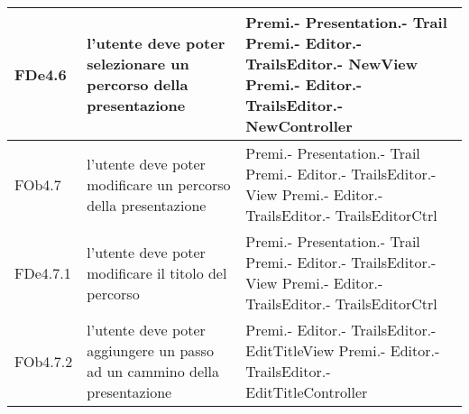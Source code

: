 \begin{longtable}{|l|p{5cm}|p{4cm}|}
\hline
FDe4.6 & l'utente deve poter selezionare un percorso della presentazione & Premi.- \linebreak Presentation.- \linebreak Trail \linebreak Premi.- \linebreak Editor.- \linebreak TrailsEditor.- \linebreak NewView \linebreak Premi.- \linebreak Editor.- \linebreak TrailsEditor.- \linebreak NewController \linebreak \\
\hline
FOb4.7 & l'utente deve poter modificare un percorso della presentazione & Premi.- \linebreak Presentation.- \linebreak Trail \linebreak Premi.- \linebreak Editor.- \linebreak TrailsEditor.- \linebreak View \linebreak Premi.- \linebreak Editor.- \linebreak TrailsEditor.- \linebreak TrailsEditorCtrl \linebreak \\
\hline
FDe4.7.1 & l'utente deve poter modificare il titolo del percorso & Premi.- \linebreak Presentation.- \linebreak Trail \linebreak Premi.- \linebreak Editor.- \linebreak TrailsEditor.- \linebreak View \linebreak Premi.- \linebreak Editor.- \linebreak TrailsEditor.- \linebreak TrailsEditorCtrl \linebreak \\
\hline
FOb4.7.2 & l'utente deve poter aggiungere un passo ad un cammino della presentazione & Premi.- \linebreak Editor.- \linebreak TrailsEditor.- \linebreak EditTitleView \linebreak Premi.- \linebreak Editor.- \linebreak TrailsEditor.- \linebreak EditTitleController \linebreak \\

\end{longtable}

